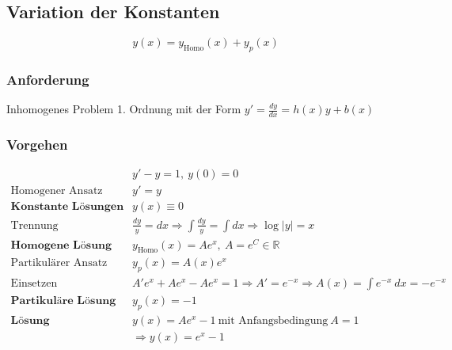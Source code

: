 \documentclass[11pt]{article}
\begin{document}
\subsection{Variation der Konstanten}

\begin{equation*}
	y(x) = y_\text{Homo}(x) + y_p(x)
\end{equation*}

\subsubsection*{Anforderung}

Inhomogenes Problem 1. Ordnung mit der Form $y' = \frac{dy}{dx} = h(x)y + b(x)$

\subsubsection*{Vorgehen}

\begin{equation*}
\begin{split}
	& y' - y = 1,\ y(0) = 0 \\
	\text{Homogener Ansatz}\quad & y' = y \\
	\textbf{Konstante L{\"o}sungen}\quad & y(x) \equiv 0 \\
	\text{Trennung}\quad & \frac{dy}{y} = dx \Rightarrow \int\frac{dy}{y} = \int dx \Rightarrow \log|y| = x \\
	\textbf{Homogene L{\"o}sung}\quad & y_\text{Homo}(x) = Ae^x,\ A = e^C \in \mathbb{R} \\
	\text{Partikul{\"a}rer Ansatz}\quad & y_p(x) = A(x)e^x \\
	\text{Einsetzen}\quad & A'e^x + Ae^x - Ae^x = 1 \Rightarrow A' = e^{-x} \Rightarrow A(x) = \int e^{-x}\ dx = -e^{-x} \\
	\textbf{Partikul{\"a}re L{\"o}sung}\quad & y_p(x) = -1 \\
	\textbf{L{\"o}sung}\quad & y(x) = Ae^x - 1\ \text{mit Anfangsbedingung}\ A = 1 \\
	& \Rightarrow y(x) = e^x - 1
\end{split}
\end{equation*}
\end{document}
